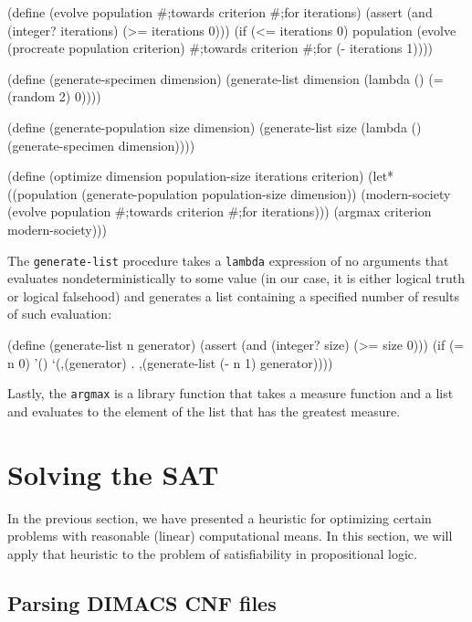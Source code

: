 \begin{Snippet}
(define (evolve population #;towards criterion #;for iterations)
  (assert (and (integer? iterations) (>= iterations 0)))
  (if (<= iterations 0)
      population
      (evolve (procreate population criterion)
              #;towards criterion 
              #;for (- iterations 1))))
\end{Snippet}
\begin{Snippet}
(define (generate-specimen dimension)
  (generate-list dimension (lambda () (= (random 2) 0))))
\end{Snippet}
\begin{Snippet}
(define (generate-population size dimension)
  (generate-list size (lambda () (generate-specimen dimension))))
\end{Snippet}
\begin{Snippet}
(define (optimize dimension population-size iterations criterion)
  (let* ((population (generate-population population-size dimension))
	 (modern-society (evolve population #;towards criterion 
				 #;for iterations)))
    (argmax criterion modern-society)))
\end{Snippet}

The \texttt{generate-list} procedure takes a \texttt{lambda} expression
of no arguments that evaluates nondeterministically to some value
(in our case, it is either logical truth or logical falsehood)
and generates a list containing a specified number of results of
such evaluation:
\begin{Snippet}
(define (generate-list n generator)
  (assert (and (integer? size) (>= size 0)))
  (if (= n 0)
      '()
      `(,(generator) . ,(generate-list (- n 1) generator))))
\end{Snippet}

Lastly, the \texttt{argmax} is a library function that takes
a measure function and a list and evaluates to the element of the
list that has the greatest measure.

\section{Solving the SAT}

In the previous section, we have presented a heuristic
for optimizing certain problems with reasonable (linear)
computational means. In this section, we will apply that
heuristic to the problem of satisfiability in propositional
logic.

\subsection{Parsing DIMACS CNF files}

